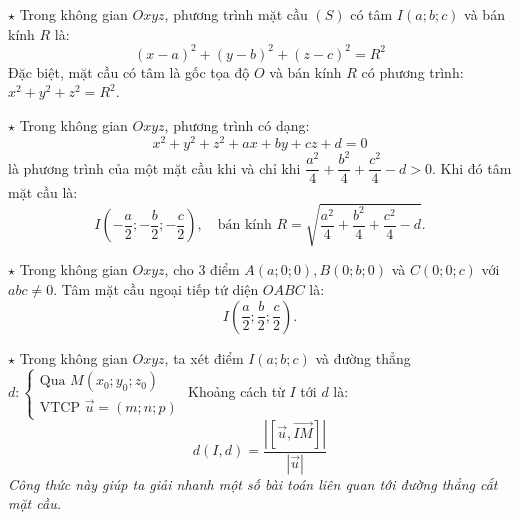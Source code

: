 \documentclass[12pt,a4paper]{extarticle}
\begin{document}
\makeheadbox[headerright={Chương 5},chude={Bài 3},tieude={Phương trình mặt cầu},dinhdang={Hình học},lop={12 },gv={Nguyễn Lê Minh Ngọc}]
\vspace{2em}
\section*{\color{myblue}{A. KIẾN THỨC NỀN TẢNG}}
\begin{tcolorbox}[colback=lightblue, colframe=myblue, arc=2mm]
\noindent $\star$ Trong không gian $Oxyz$, phương trình mặt cầu $(S)$ có tâm $I(a; b; c)$ và bán kính $R$ là:
\[
(x - a)^2 + (y - b)^2 + (z - c)^2 = R^2
\]
Đặc biệt, mặt cầu có tâm là gốc tọa độ $O$ và bán kính $R$ có phương trình: $x^2 + y^2 + z^2 = R^2$.
\end{tcolorbox}
\vspace{0.3cm}
\begin{tcolorbox}[colback=lightblue, colframe=myblue, arc=2mm]
\noindent $\star$ Trong không gian $Oxyz$, phương trình có dạng:
\[
x^2 + y^2 + z^2 + ax + by + cz + d = 0
\]
là phương trình của một mặt cầu khi và chỉ khi $\dfrac{a^2}{4} + \dfrac{b^2}{4} + \dfrac{c^2}{4} - d > 0$. Khi đó tâm mặt cầu là:
\[
I\left(-\frac{a}{2}; -\frac{b}{2}; -\frac{c}{2}\right), \quad \text{bán kính } R = \sqrt{\frac{a^2}{4} + \frac{b^2}{4} + \frac{c^2}{4} - d}.
\]
\end{tcolorbox}
\vspace{0.3cm}
\begin{tcolorbox}[colback=lightblue, colframe=myblue, arc=2mm]
\noindent $\star$ Trong không gian $Oxyz$, cho 3 điểm $A(a; 0; 0), B(0; b; 0)$ và $C(0; 0; c)$ với $abc \neq 0$. Tâm mặt cầu ngoại tiếp tứ diện $OABC$ là:
\[
I\left(\frac{a}{2}; \frac{b}{2}; \frac{c}{2}\right).
\]
\end{tcolorbox}
\vspace{0.3cm}
\begin{tcolorbox}[colback=lightblue, colframe=myblue, arc=2mm]
\noindent $\star$ Trong không gian $Oxyz$, ta xét điểm $I(a; b; c)$ và đường thẳng $d: \begin{cases} \text{Qua } M(x_0; y_0; z_0) \\ \text{VTCP } \vec{u} = (m; n; p) \end{cases}$
\vspace{0.2cm}
Khoảng cách từ $I$ tới $d$ là:
\[
d(I, d) = \frac{\left|[\vec{u}, \vec{IM}]\right|}{|\vec{u}|}
\]
\textit{Công thức này giúp ta giải nhanh một số bài toán liên quan tới đường thẳng cắt mặt cầu.}
\end{tcolorbox}
\end{document}
